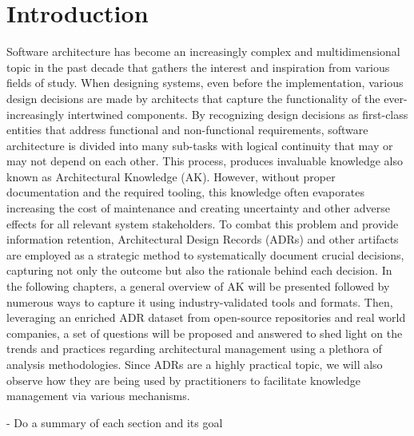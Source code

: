 \chapter{Introduction}
    Software architecture has become an increasingly complex and multidimensional topic in the past decade that gathers the interest and inspiration from various fields of study. When designing systems, even before the implementation, various design decisions are made by architects that capture the functionality of the ever-increasingly intertwined components. By recognizing design decisions as first-class entities that address functional and non-functional requirements, software architecture is divided into many sub-tasks with logical continuity that may or may not depend on each other.\cite{Arch+DesignDescisions} This process, produces invaluable knowledge also known as Architectural Knowledge (AK). However, without proper documentation and the required tooling, this knowledge often evaporates increasing the cost of maintenance and creating uncertainty and other adverse effects for all relevant system stakeholders. To combat this problem and provide information retention,  Architectural Design Records (ADRs) and other artifacts are employed as a strategic method to systematically document crucial decisions, capturing not only the outcome but also the rationale behind each decision. In the following chapters, a general overview of AK will be presented followed by numerous ways to capture it using industry-validated tools and formats. Then, leveraging an enriched ADR dataset from open-source repositories and real world companies, a set of questions will be proposed and answered to shed light on the trends and practices regarding architectural management using a plethora of analysis methodologies. Since ADRs are a highly practical topic, we will also observe how they are being used by practitioners to facilitate knowledge management via various mechanisms.

    - Do a summary of each section and its goal